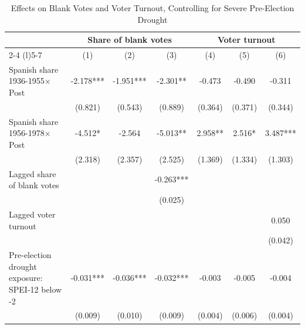 \begin{table}[!h]
\caption{Effects on Blank Votes and Voter Turnout, Controlling for Severe Pre-Election Drought}
\renewcommand{\arraystretch}{1.25}
\setlength{\tabcolsep}{6pt}
\centering
\begin{tabular}[t]{lcccccc}
\hline
 & \multicolumn{3}{c}{Share of blank votes} & \multicolumn{3}{c}{Voter turnout} \\
\cmidrule(l){2-4} \cmidrule(l){5-7}
  & (1) & (2) & (3) & (4) & (5) & (6)\\
\hline
Spanish share 1936-1955$\times$Post & -2.178*** & -1.951*** & -2.301** & -0.473 & -0.490 & -0.311\\
 & (0.821) & (0.543) & (0.889) & (0.364) & (0.371) & (0.344)\\
Spanish share 1956-1978$\times$Post & -4.512* & -2.564 & -5.013** & 2.958** & 2.516* & 3.487***\\
 & (2.318) & (2.357) & (2.525) & (1.369) & (1.334) & (1.303)\\
Lagged share of blank votes &  &  & -0.263*** &  &  & \\
 &  &  & (0.025) &  &  & \\
Lagged voter turnout &  &  &  &  &  & 0.050\\
 &  &  &  &  &  & (0.042)\\
Pre-election drought exposure: SPEI-12 below -2 & -0.031*** & -0.036*** & -0.032*** & -0.003 & -0.005 & -0.004\\
 & (0.009) & (0.010) & (0.009) & (0.004) & (0.006) & (0.004)\\


\end{tabular}
\end{table}
